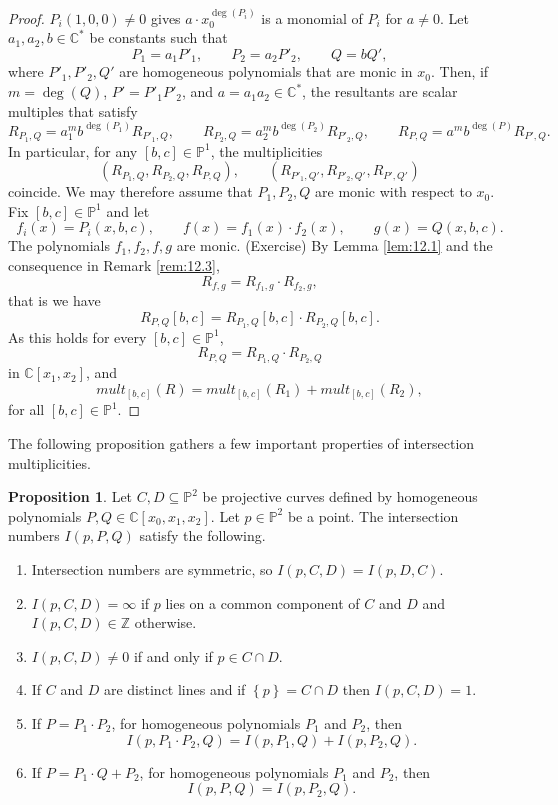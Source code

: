 \documentclass{article}
\newcommand{\Z}{\mathbb{Z}}
\newcommand{\C}{\mathbb{C}}
\renewcommand{\P}{\mathbb{P}}
\newcommand{\rb}[1]{\left( #1 \right)}
\renewcommand{\sb}[1]{\left[ #1 \right]}
\newcommand{\cb}[1]{\left\{ #1 \right\}}
\theoremstyle{definition}\newtheorem{definition}{Definition}[section]
\theoremstyle{definition}\newtheorem{notation}[definition]{Notation}
\theoremstyle{definition}\newtheorem{remark}[definition]{Remark}
\theoremstyle{definition}\newtheorem{example1}[definition]{Example}
\theoremstyle{definition}\newtheorem{fact}{Fact}
\theoremstyle{definition}\newtheorem{exercise}{Exercise}
\theoremstyle{definition}\newtheorem*{example2}{Example}
\newtheorem{proposition}[definition]{Proposition}
\begin{document}
\begin{proof}
$ P_i\rb{1, 0, 0} \ne 0 $ gives $ a \cdot x_0^{\deg\rb{P_i}} $ is a monomial of $ P_i $ for $ a \ne 0 $. Let $ a_1, a_2, b \in \C^* $ be constants such that
$$ P_1 = a_1P'_1, \qquad P_2 = a_2P'_2, \qquad Q = bQ', $$
where $ P'_1, P'_2, Q' $ are homogeneous polynomials that are monic in $ x_0 $. Then, if $ m = \deg\rb{Q} $, $ P' = P'_1P'_2 $, and $ a = a_1a_2 \in \C^* $, the resultants are scalar multiples that satisfy
$$ R_{P_1, Q} = a_1^mb^{\deg\rb{P_1}}R_{P'_1, Q}, \qquad R_{P_2, Q} = a_2^mb^{\deg\rb{P_2}}R_{P'_2, Q}, \qquad R_{P, Q} = a^mb^{\deg\rb{P}}R_{P', Q}. $$
In particular, for any $ \sb{b, c} \in \P^1 $, the multiplicities
$$ \rb{R_{P_1, Q}, R_{P_2, Q}, R_{P, Q}}, \qquad \rb{R_{P'_1, Q'}, R_{P'_2, Q'}, R_{P', Q'}} $$
coincide. We may therefore assume that $ P_1, P_2, Q $ are monic with respect to $ x_0 $. Fix $ \sb{b, c} \in \P^1 $ and let
$$ f_i\rb{x} = P_i\rb{x, b, c}, \qquad f\rb{x} = f_1\rb{x} \cdot f_2\rb{x}, \qquad g\rb{x} = Q\rb{x, b, c}. $$
The polynomials $ f_1, f_2, f, g $ are monic. (Exercise) By Lemma \ref{lem:12.1} and the consequence in Remark \ref{rem:12.3},
$$ R_{f, g} = R_{f_1, g} \cdot R_{f_2, g}, $$
that is we have
$$ R_{P, Q}\sb{b, c} = R_{P_1, Q}\sb{b, c} \cdot R_{P_2, Q}\sb{b, c}. $$
As this holds for every $ \sb{b, c} \in \P^1 $,
$$ R_{P, Q} =  R_{P_1, Q} \cdot R_{P_2, Q} $$
in $ \C\sb{x_1, x_2} $, and
$$ mult_{\sb{b, c}}\rb{R} = mult_{\sb{b, c}}\rb{R_1} + mult_{\sb{b, c}}\rb{R_2}, $$
for all $ \sb{b, c} \in \P^1 $.
\end{proof}

The following proposition gathers a few important properties of intersection multiplicities.

\begin{proposition}
\label{prop:12.5}
Let $ C, D \subseteq \P^2 $ be projective curves defined by homogeneous polynomials $ P, Q \in \C\sb{x_0, x_1, x_2} $. Let $ p \in \P^2 $ be a point. The intersection numbers $ I\rb{p, P, Q} $ satisfy the following.
\begin{enumerate}
\item Intersection numbers are symmetric, so $ I\rb{p, C, D} = I\rb{p, D, C} $.
\item $ I\rb{p, C, D} = \infty $ if $ p $ lies on a common component of $ C $ and $ D $ and $ I\rb{p, C, D} \in \Z $ otherwise.
\item $ I\rb{p, C, D} \ne 0 $ if and only if $ p \in C \cap D $.
\item If $ C $ and $ D $ are distinct lines and if $ \cb{p} = C \cap D $ then $ I\rb{p, C, D} = 1 $.
\item If $ P = P_1 \cdot P_2 $, for homogeneous polynomials $ P_1 $ and $ P_2 $, then
$$ I\rb{p, P_1 \cdot P_2, Q} = I\rb{p, P_1, Q} + I\rb{p, P_2, Q}. $$
\item If $ P = P_1 \cdot Q + P_2 $, for homogeneous polynomials $ P_1 $ and $ P_2 $, then
$$ I\rb{p, P, Q} = I\rb{p, P_2, Q}. $$
\end{enumerate}
\end{proposition}
\end{document}
